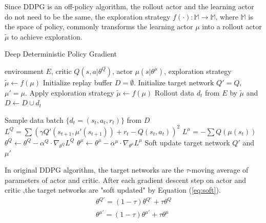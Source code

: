Since DDPG is an off-policy algorithm, the rollout actor and the learning actor do not need to be the same, the exploration strategy $f(\cdot) : \mathbb{M} \rightarrow \mathbb{M}$, where $\mathbb{M}$ is the space of policy, commonly transforms the learning actor $\mu$ into a rollout actor $\tilde\mu$ to achieve exploration.

\begin{algorithm}[htbp]
   \caption{Deep Deterministic Policy Gradient}
   \label{alg:DDPG}
\begin{algorithmic}
    environment $E$, critic $Q(s,a|\theta^Q)$, actor $\mu(s|\theta^\mu)$, exploration strategy $\tilde\mu \leftarrow f(\mu)$
   \STATE Initialize replay buffer $D = \emptyset$.
   \STATE Initialize target network $Q'= Q$, $\mu'= \mu$.
   \STATE Apply exploration strategy $\tilde\mu \leftarrow f(\mu)$
   \STATE Rollout data $d_t$ from $E$ by $\tilde\mu$ and $D \leftarrow D\cup {d_t}$

   \STATE Sample data batch $\{d_t=(s_t,a_t,r_t)\}$ from $D$
   \STATE $L^Q=\sum(\gamma Q'(s_{t+1},\mu'(s_{t+1}))+r_t-Q(s_t,a_t))^2$
   \STATE $L^\mu=-\sum Q(\mu(s_t))$
   \STATE $\theta^Q \leftarrow \theta^Q - \alpha^Q\cdot\nabla_{\theta^Q} L^Q$
   \STATE $\theta^\mu \leftarrow \theta^\mu -\alpha^\mu\cdot\nabla_{\theta^\mu} L^\mu$
   \STATE Soft update target network $Q'$ and $\mu'$
   \ENDFOR
   \ENDFOR
\end{algorithmic}
\end{algorithm}

In original DDPG algorithm, the target networks are the $\tau$-moving average of parameters of actor and critic. After each gradient descent step on actor and critic ,the target networks are "soft updated" by Equation (\ref{eq:soft}).
\begin{equation}
\label{eq:soft} 
\begin{aligned}
\theta^{Q'} = (1-\tau)\theta^{Q'}+\tau\theta^Q\\
\theta^{\mu'} = (1-\tau)\theta^{\mu'}+\tau\theta^\mu
\end{aligned}
\end{equation}

